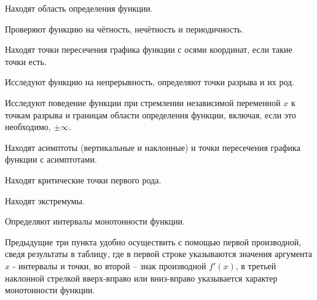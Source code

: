 \begin{list}{.}{}

\item Находят область определения функции.

\item Проверяют функцию на чётность, нечётность и периодичность.

\item Находят точки пересечения графика функции с осями координат, если такие точки есть.

\item Исследуют функцию на непрерывность, определяют точки разрыва и их род.

\item Исследуют поведение функции при стремлении независимой переменной $x$ к точкам разрыва и границам области определения функции, включая, если это необходимо, $\pm \infty$.

\item Находят асимптоты (вертикальные и наклонные) и точки пересечения графика функции с асимптотами.

\item Находят критические точки первого рода.

\item Находят экстремумы.

\item Определяют интервалы монотонности функции.

Предыдущие три пункта удобно осуществить с помощью первой производной, сведя результаты в таблицу, где в первой строке указываются значения аргумента $x$ - интервалы и точки, во второй -- знак производной $f'(x)$, в третьей наклонной стрелкой вверх-вправо \nearrow или вниз-вправо \searrow указывается характер монотонности функции.

\item

\end{list}
